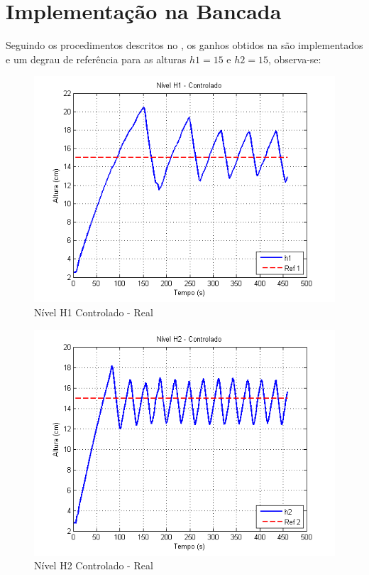 \section{Implementação na Bancada} \label{secResImp}
Seguindo os procedimentos descritos no , os ganhos obtidos na  são implementados e um degrau de referência para as alturas $h1=15$ e $h2=15$, observa-se:
\begin{figure}[H]
	\centering
	\includegraphics[height=0.35\paperheight,keepaspectratio]{img/ctrl_realh1.png}
	\caption{\small Nível H1 Controlado - Real}
	\label{imgH1Real}
\end{figure}

\begin{figure}[H]
	\centering
	\includegraphics[height=0.35\paperheight,keepaspectratio]{img/ctrl_realh2.png}
	\caption{Nível H2 Controlado - Real}
	\label{imgH2Real}
\end{figure}

